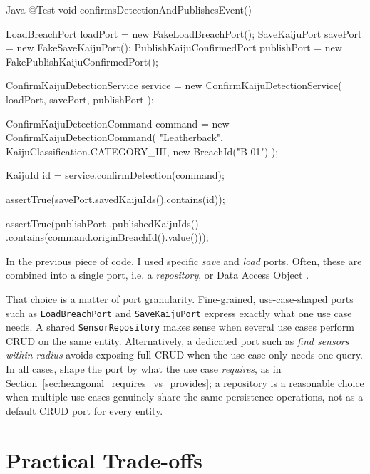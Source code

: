 \begin{ridercode}{Java}
@Test
void confirmsDetectionAndPublishesEvent()
{
    LoadBreachPort loadPort = new FakeLoadBreachPort();
    SaveKaijuPort savePort = new FakeSaveKaijuPort();
    PublishKaijuConfirmedPort publishPort =
        new FakePublishKaijuConfirmedPort();

    ConfirmKaijuDetectionService service =
        new ConfirmKaijuDetectionService(
            loadPort,
            savePort,
            publishPort
        );

    ConfirmKaijuDetectionCommand command =
        new ConfirmKaijuDetectionCommand(
            "Leatherback",
            KaijuClassification.CATEGORY_III,
            new BreachId("B-01")
        );

    KaijuId id = service.confirmDetection(command);

    assertTrue(savePort.savedKaijuIds().contains(id));

    assertTrue(publishPort
        .publishedKaijuIds()
        .contains(command.originBreachId().value()));
}
\end{ridercode}
\label{lst:confirm-detection-test}

In the previous piece of code, I used specific \textit{save} and \textit{load} ports. Often, these are combined into a single port, i.e. a \textit{repository},  or Data Access Object .

That choice is a matter of port granularity. Fine-grained, use-case-shaped ports such as \texttt{LoadBreachPort} and \texttt{SaveKaijuPort} express exactly what one use case needs. A shared \texttt{SensorRepository} makes sense when several use cases perform CRUD on the same entity. Alternatively, a dedicated port such as \textit{find sensors within radius} avoids exposing full CRUD when the use case only needs one query. In all cases, shape the port by what the use case \textit{requires}, as in Section~\ref{sec:hexagonal_requires_vs_provides}; a repository is a reasonable choice when multiple use cases genuinely share the same persistence operations, not as a default CRUD port for every entity.

\section{Practical Trade-offs}
\label{sec:hexagonal_tradeoffs}


